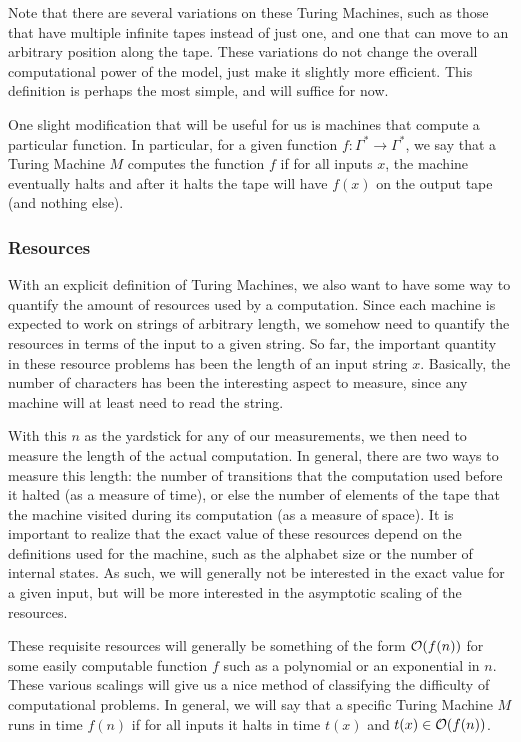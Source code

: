 \documentclass[../thesis-main/thesis-main]{subfiles}
\begin{document}
Note that there are several variations on these Turing Machines, such as those that have multiple infinite tapes instead of just one, and one that can move to an arbitrary position along the tape.  These variations do not change the overall computational power of the model, just make it slightly more efficient.  This definition is perhaps the most simple, and will suffice for now.


One slight modification that will be useful for us is machines that compute a particular function.  In particular, for a given function $f:\Gamma^*\rightarrow \Gamma^*$, we say that a Turing Machine $M$ computes the function $f$ if for all inputs $x$, the machine eventually halts and after it halts the tape will have $f(x)$ on the output tape (and nothing else).

\subsubsection{Resources}

With an explicit definition of Turing Machines, we also want to have some way to quantify the amount of resources used by a computation.  Since each machine is expected to work on strings of arbitrary length, we somehow need to quantify the resources in terms of the input to a given string.    So far, the important quantity in these resource problems has been the length of an input string $x$.  Basically, the number of characters has been the interesting aspect to measure, since any machine will at least need to read the string.

With this $n$ as the yardstick for any of our measurements, we then need to measure the length of the actual computation.  In general, there are two ways to measure this length: the number of transitions that the computation used before it halted (as a measure of time), or else the number of elements of the tape that the machine visited during its computation (as a measure of space).  It is important to realize that the exact value of these resources depend on the definitions used for the machine, such as the alphabet size or the number of internal states.  As such, we will generally not be interested in the exact value for a given input, but will be more interested in the asymptotic scaling of the resources.

These requisite resources will generally be something of the form $\mathcal{O}(f(n))$ for some easily computable function $f$ such as a polynomial or an exponential in $n$.  These various scalings will give us a nice method of classifying the difficulty of computational problems.  In general, we will say that a specific Turing Machine $M$ runs in time $f(n)$ if for all inputs it halts in time $t(x)$ and $t(x) \in \mathcal{O}(f(n))$.
\end{document}
